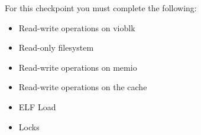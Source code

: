 \documentclass{article}
\begin{document}
	For this checkpoint you must complete the following: 
	\begin{itemize}
		\item Read-write operations on {\fix vioblk}
		\item Read-only filesystem
		\item Read-write operations on {\fix memio}
		\item Read-write operations on the cache
		\item ELF Load 
		\item Locks
	\end{itemize}

\end{document}
